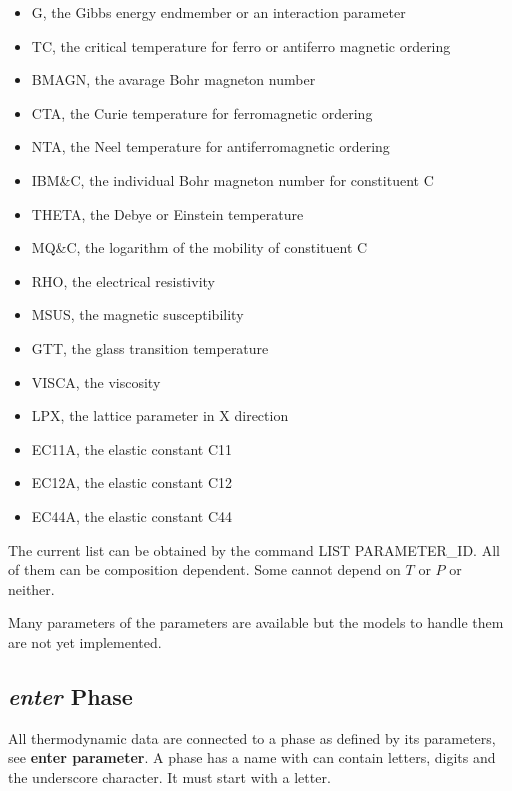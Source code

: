 \documentclass[12pt]{article}
\begin{document}
\begin{itemize}
\item G, the Gibbs energy endmember or an interaction parameter
\item TC, the critical temperature for ferro or antiferro magnetic ordering
\item BMAGN, the avarage Bohr magneton number
\item CTA, the Curie temperature for ferromagnetic ordering
\item NTA, the Neel temperature for antiferromagnetic ordering
\item IBM\&C, the individual Bohr magneton number for constituent C
\item THETA, the Debye or Einstein temperature
\item MQ\&C, the logarithm of the mobility of constituent C
\item RHO, the electrical resistivity
\item MSUS, the magnetic susceptibility
\item GTT, the glass transition temperature
\item VISCA, the viscosity
\item LPX, the lattice parameter in X direction
\item EC11A, the elastic constant C11
\item EC12A, the elastic constant C12
\item EC44A, the elastic constant C44
\end{itemize}

The current list can be obtained by the command LIST PARAMETER\_ID.
All of them can be composition dependent.  Some cannot depend on $T$
or $P$ or neither.

Many parameters of the parameters are available but the models to
handle them are not yet implemented.

\subsection{{\em enter} Phase}

All thermodynamic data are connected to a phase as defined by its
parameters, see {\bf enter parameter}.  A phase has a name with can
contain letters, digits and the underscore character.  It must start
with a letter.
\end{document}
